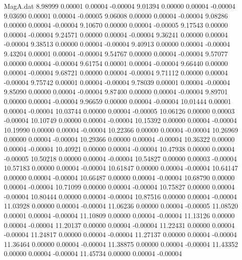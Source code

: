 \begin{filecontents}{MagA.dat}
   8.98999    0.00001    0.00004   -0.00004
   9.01394    0.00000    0.00004   -0.00004
   9.03690    0.00001    0.00004   -0.00005
   9.06008    0.00000    0.00004   -0.00004
   9.08286    0.00000    0.00004   -0.00004
   9.10670    0.00000    0.00004   -0.00005
   9.17543    0.00000    0.00004   -0.00004
   9.24571    0.00000    0.00004   -0.00004
   9.36241    0.00000    0.00004   -0.00004
   9.38513    0.00000    0.00004   -0.00004
   9.40913    0.00000    0.00004   -0.00004
   9.43204    0.00001    0.00004   -0.00004
   9.54767    0.00000    0.00004   -0.00004
   9.57077    0.00000    0.00004   -0.00004
   9.61754    0.00001    0.00004   -0.00004
   9.66440    0.00000    0.00004   -0.00004
   9.68721    0.00000    0.00004   -0.00004
   9.71112    0.00000    0.00004   -0.00004
   9.75742    0.00001    0.00004   -0.00004
   9.78039    0.00001    0.00004   -0.00004
   9.85090    0.00000    0.00004   -0.00004
   9.87400    0.00000    0.00004   -0.00004
   9.89701    0.00000    0.00004   -0.00004
   9.96659    0.00000    0.00004   -0.00004
  10.01444    0.00001    0.00004   -0.00004
  10.03744    0.00000    0.00004   -0.00005
  10.06126    0.00000    0.00003   -0.00004
  10.10749    0.00000    0.00004   -0.00004
  10.15392    0.00000    0.00004   -0.00004
  10.19990    0.00000    0.00004   -0.00004
  10.22366    0.00000    0.00004   -0.00004
  10.26969    0.00000    0.00004   -0.00004
  10.29366    0.00000    0.00004   -0.00004
  10.36322    0.00000    0.00004   -0.00004
  10.40921    0.00000    0.00004   -0.00004
  10.47938    0.00000    0.00004   -0.00005
  10.50218    0.00000    0.00004   -0.00004
  10.54827    0.00000    0.00003   -0.00004
  10.57183    0.00000    0.00004   -0.00004
  10.61847    0.00000    0.00004   -0.00004
  10.64147    0.00000    0.00004   -0.00004
  10.66487    0.00000    0.00004   -0.00004
  10.68790    0.00000    0.00004   -0.00004
  10.71099    0.00000    0.00004   -0.00004
  10.75827    0.00000    0.00004   -0.00004
  10.80444    0.00000    0.00004   -0.00004
  10.87516    0.00000    0.00004   -0.00004
  11.03928    0.00000    0.00004   -0.00004
  11.06236    0.00000    0.00004   -0.00005
  11.08520    0.00001    0.00004   -0.00004
  11.10809    0.00000    0.00004   -0.00004
  11.13126    0.00000    0.00004   -0.00004
  11.20137    0.00000    0.00004   -0.00004
  11.22431    0.00000    0.00004   -0.00004
  11.24817    0.00000    0.00004   -0.00004
  11.27137    0.00000    0.00004   -0.00004
  11.36464    0.00000    0.00004   -0.00004
  11.38875    0.00000    0.00004   -0.00004
  11.43352    0.00000    0.00004   -0.00004
  11.45734    0.00000    0.00004   -0.00004

\end{filecontents}
